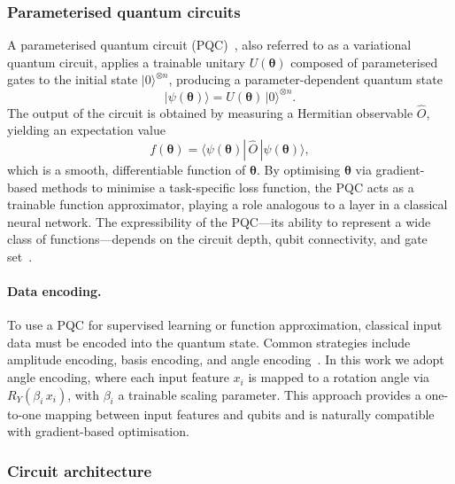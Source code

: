\subsubsection{Parameterised quantum circuits}

A parameterised quantum circuit
(PQC)~\cite{benedetti2019parameterized}, also referred to as a
variational quantum circuit, applies a trainable unitary
$U(\boldsymbol{\theta})$ composed of parameterised gates to the initial
state $|0\rangle^{\otimes n}$, producing a parameter-dependent quantum
state
\begin{equation}
  |\psi(\boldsymbol{\theta})\rangle
  = U(\boldsymbol{\theta})\,|0\rangle^{\otimes n}.
\end{equation}
The output of the circuit is obtained by measuring a Hermitian
observable $\hat{O}$, yielding an expectation value
\begin{equation}
  f(\boldsymbol{\theta})
  = \langle\psi(\boldsymbol{\theta})|\,\hat{O}\,|\psi(\boldsymbol{\theta})\rangle,
\end{equation}
which is a smooth, differentiable function of
$\boldsymbol{\theta}$.  By optimising $\boldsymbol{\theta}$ via
gradient-based methods to minimise a task-specific loss function, the
PQC acts as a trainable function approximator, playing a role analogous
to a layer in a classical neural network.  The expressibility of the PQC---its
ability to represent a wide class of functions---depends on the circuit
depth, qubit connectivity, and gate set~\cite{sim2019expressibility}.

\paragraph{Data encoding.}
To use a PQC for supervised learning or function approximation,
classical input data must be encoded into the quantum state.  Common
strategies include amplitude encoding, basis encoding, and angle
encoding~\cite{schuld2021machine}.  In this work we adopt angle
encoding, where each input feature $x_i$ is mapped to a rotation angle
via $R_Y(\beta_i\, x_i)$, with $\beta_i$ a trainable scaling parameter.
This approach provides a one-to-one mapping between input features and
qubits and is naturally compatible with gradient-based optimisation.

\subsubsection{Circuit architecture}
\label{sec:circuit_architecture}

